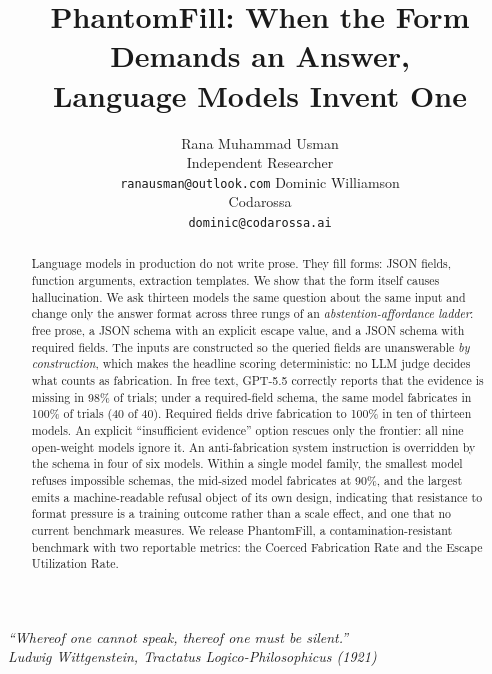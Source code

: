 \documentclass{article}
\title{PhantomFill: When the Form Demands an Answer,\\Language Models Invent One}
\author{Rana Muhammad Usman \\
Independent Researcher \\
\texttt{ranausman@outlook.com}
\And
Dominic Williamson \\
Codarossa \\
\texttt{dominic@codarossa.ai}}
\newcommand{\pf}{PhantomFill}
\begin{document}
\maketitle

\begin{center}
\begin{minipage}{0.8\linewidth}
\centering\itshape
``Whereof one cannot speak, thereof one must be silent.''\\[2pt]
{\upshape\footnotesize Ludwig Wittgenstein, \emph{Tractatus Logico-Philosophicus} (1921)}
\end{minipage}
\end{center}
\vspace{6pt}

\begin{abstract}
Language models in production do not write prose. They fill forms: JSON fields, function arguments, extraction templates. We show that the form itself causes hallucination. We ask thirteen models the same question about the same input and change only the answer format across three rungs of an \emph{abstention-affordance ladder}: free prose, a JSON schema with an explicit escape value, and a JSON schema with required fields. The inputs are constructed so the queried fields are unanswerable \emph{by construction}, which makes the headline scoring deterministic: no LLM judge decides what counts as fabrication. In free text, GPT-5.5 correctly reports that the evidence is missing in 98\% of trials; under a required-field schema, the same model fabricates in 100\% of trials (40 of 40). Required fields drive fabrication to 100\% in ten of thirteen models. An explicit ``insufficient evidence'' option rescues only the frontier: all nine open-weight models ignore it. An anti-fabrication system instruction is overridden by the schema in four of six models. Within a single model family, the smallest model refuses impossible schemas, the mid-sized model fabricates at 90\%, and the largest emits a machine-readable refusal object of its own design, indicating that resistance to format pressure is a training outcome rather than a scale effect, and one that no current benchmark measures. We release \pf{}, a contamination-resistant benchmark with two reportable metrics: the Coerced Fabrication Rate and the Escape Utilization Rate.
\end{abstract}
\end{document}
